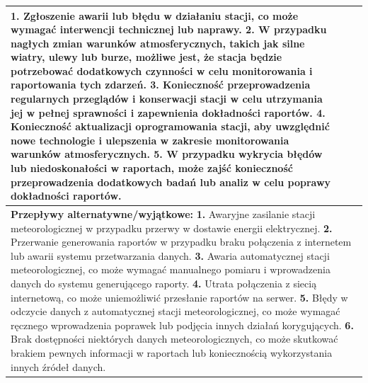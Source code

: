 \documentclass{article}
\begin{document}
\begin{center}
\begin{center}
\begin{tabular}{|l|l|l|}
{        \textbf{1.} Zgłoszenie awarii lub błędu w działaniu stacji, co może wymagać interwencji technicznej lub naprawy.
        \newline
        \textbf{2.} W przypadku nagłych zmian warunków atmosferycznych, takich jak silne wiatry, ulewy lub burze, możliwe jest, że stacja będzie potrzebować dodatkowych czynności w celu monitorowania i raportowania tych zdarzeń.
        \newline
        \textbf{3.} Konieczność przeprowadzenia regularnych przeglądów i konserwacji stacji w celu utrzymania jej w pełnej sprawności i zapewnienia dokładności raportów.
        \newline
        \textbf{4.} Konieczność aktualizacji oprogramowania stacji, aby uwzględnić nowe technologie i ulepszenia w zakresie monitorowania warunków atmosferycznych.
        \newline
        \textbf{5.} W przypadku wykrycia błędów lub niedoskonałości w raportach, może zajść konieczność przeprowadzenia dodatkowych badań lub analiz w celu poprawy dokładności raportów.} \\
        \hline
        \hline
        \multicolumn{3}{|p{\dimexpr\linewidth-2\tabcolsep-2\arrayrulewidth}|}{\textbf{Przepływy alternatywne/wyjątkowe:}
        \newline
        \textbf{1.} Awaryjne zasilanie stacji meteorologicznej w przypadku przerwy w dostawie energii elektrycznej.
        \newline
        \textbf{2.} Przerwanie generowania raportów w przypadku braku połączenia z internetem lub awarii systemu przetwarzania danych.
        \newline
        \textbf{3.} Awaria automatycznej stacji meteorologicznej, co może wymagać manualnego pomiaru i wprowadzenia danych do systemu generującego raporty.
        \newline
        \textbf{4.} Utrata połączenia z siecią internetową, co może uniemożliwić przesłanie raportów na serwer.
        \newline
        \textbf{5.} Błędy w odczycie danych z automatycznej stacji meteorologicznej, co może wymagać ręcznego wprowadzenia poprawek lub podjęcia innych działań korygujących.
        \newline
        \textbf{6.} Brak dostępności niektórych danych meteorologicznych, co może skutkować brakiem pewnych informacji w raportach lub koniecznością wykorzystania innych źródeł danych.} \\
        \hline
        \end{tabular}
    \end{center}


\end{center}
\end{document}
